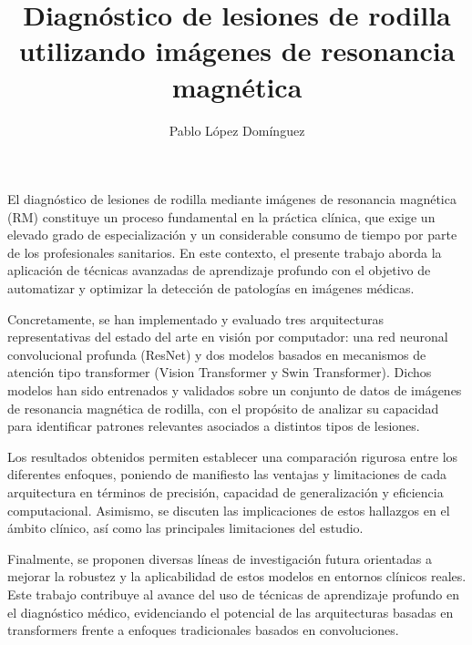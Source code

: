 \documentclass[twoside,spanish,a4paper,12pt]{tfg}
\title{Diagnóstico de lesiones de rodilla utilizando imágenes de resonancia magnética}
\author{Pablo López Domínguez}
\begin{document}
\portada
\cleardoublepage

\cleardoublepage
\contraportada
\cleardoublepage
\declaracion
\cleardoublepage


\begin{resumen}
El diagnóstico de lesiones de rodilla mediante imágenes de resonancia magnética (RM) constituye un proceso fundamental en la práctica clínica, que exige un elevado grado de especialización y un considerable consumo de tiempo por parte de los profesionales sanitarios. En este contexto, el presente trabajo aborda la aplicación de técnicas avanzadas de aprendizaje profundo con el objetivo de automatizar y optimizar la detección de patologías en imágenes médicas.

Concretamente, se han implementado y evaluado tres arquitecturas representativas del estado del arte en visión por computador: una red neuronal convolucional profunda (ResNet) y dos modelos basados en mecanismos de atención tipo transformer (Vision Transformer y Swin Transformer). Dichos modelos han sido entrenados y validados sobre un conjunto de datos de imágenes de resonancia magnética de rodilla, con el propósito de analizar su capacidad para identificar patrones relevantes asociados a distintos tipos de lesiones.

Los resultados obtenidos permiten establecer una comparación rigurosa entre los diferentes enfoques, poniendo de manifiesto las ventajas y limitaciones de cada arquitectura en términos de precisión, capacidad de generalización y eficiencia computacional. Asimismo, se discuten las implicaciones de estos hallazgos en el ámbito clínico, así como las principales limitaciones del estudio.

Finalmente, se proponen diversas líneas de investigación futura orientadas a mejorar la robustez y la aplicabilidad de estos modelos en entornos clínicos reales. Este trabajo contribuye al avance del uso de técnicas de aprendizaje profundo en el diagnóstico médico, evidenciando el potencial de las arquitecturas basadas en transformers frente a enfoques tradicionales basados en convoluciones.
\end{resumen}
\cleardoublepage
\end{document}
